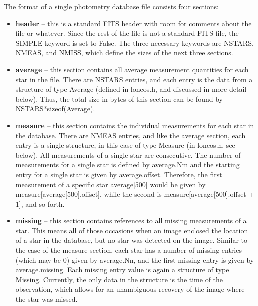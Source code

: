 \documentclass{article}
\begin{document}
The format of a single photometry database file consists four
sections:  
\begin{itemize}
\item {\bf header} -- this is a standard FITS header with room for comments
  about the file or whatever.  Since the rest of the file is not a
  standard FITS file, the SIMPLE keyword is set to False.  The three
  necessary keywords are NSTARS, NMEAS, and NMISS, which define the
  sizes of the next three sections.
\item {\bf average} -- this section contains all average measurement
  quantities for each star in the file.  There are NSTARS entries, and
  each entry is the data from a structure of type Average (defined in
  loneos.h, and discussed in more detail below).  Thus, the total size
  in bytes of this section can be found by NSTARS*sizeof(Average).
\item {\bf measure} -- this section contains the individual
  measurements for each star in the database.  There are NMEAS
  entries, and like the average section, each entry is a single
  structure, in this case of type Measure (in loneos.h, see below).
  All measurements of a single star are consecutive.  The number of
  measurements for a single star is defined by average.Nm and the
  starting entry for a single star is given by average.offset.
  Therefore, the first measurement of a specific star average[500]
  would be given by measure[average[500].offset], while the second is 
  measure[average[500].offset + 1], and so forth.  
\item {\bf missing} -- this section contains references to all missing
  measurements of a star.  This means all of those occasions when an
  image enclosed the location of a star in the database, but no star
  was detected on the image.  Similar to the case of the measure
  section, each star has a number of missing entries (which may be 0)
  given by average.Nn, and the first missing entry is given by
  average.missing.  Each missing entry value is again a structure of
  type Missing.  Currently, the only data in the structure is the time
  of the observation, which allows for an unambiguous recovery of the
  image where the star was missed.
\end{itemize}
\end{document}
